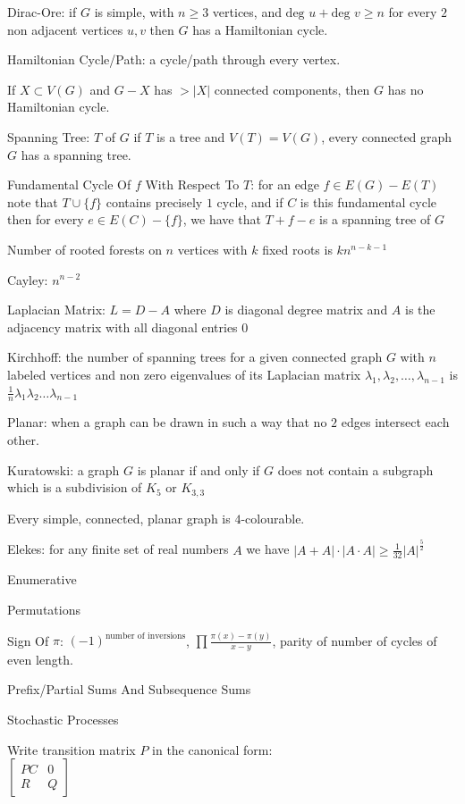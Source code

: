 Dirac-Ore: if $G$ is simple, with $n \ge 3$ vertices, and $\text{deg }u+\text{deg }v \ge n$ for every $2$ non adjacent vertices $u,v$ then $G$ has a Hamiltonian cycle.

Hamiltonian Cycle/Path: a cycle/path through every vertex.

If $X \subset V(G)$ and $G-X$ has $> |X|$ connected components, then $G$ has no Hamiltonian cycle.

Spanning Tree: $T$ of $G$ if $T$ is a tree and $V(T)=V(G)$, every connected graph $G$ has a spanning tree.

Fundamental Cycle Of $f$ With Respect To $T$: for an edge $f \in E(G)-E(T)$ note that $T \cup \{f \}$ contains precisely $1$ cycle, and if $C$ is this fundamental cycle then for every $e \in E(C) - \{ f \}$, we have that $T+f-e$ is a spanning tree of $G$

Number of rooted forests on $n$ vertices with $k$ fixed roots is $kn^{n-k-1}$

Cayley: $n^{n-2}$

Laplacian Matrix: $L=D-A$ where $D$ is diagonal degree matrix and $A$ is the adjacency matrix with all diagonal entries $0$

Kirchhoff: the number of spanning trees for a given connected graph $G$ with $n$ labeled vertices and non zero eigenvalues of its Laplacian matrix $\lambda_1, \lambda_2, \dots, \lambda_{n-1}$ is $\frac{1}{n} \lambda_1 \lambda_2 \dots \lambda_{n-1}$

Planar: when a graph can be drawn in such a way that no $2$ edges intersect each other.

Kuratowski: a graph $G$ is planar if and only if $G$ does not contain a subgraph which is a subdivision of $K_5$ or $K_{3,3}$

Every simple, connected, planar graph is $4$-colourable.

Elekes: for any finite set of real numbers $A$ we have $|A+A| \cdot |A \cdot A| \ge \frac{1}{32} |A|^{\frac{5}{2}}$

Enumerative

Permutations

Sign Of $\pi$: $(-1)^{\text{number of inversions}}$, $\prod \frac{\pi(x)-\pi(y)}{x-y}$, parity of number of cycles of even length.

Prefix/Partial Sums And Subsequence Sums

Stochastic Processes

Write transition matrix $P$ in the canonical form: \\
$\begin{bmatrix}
PC & 0 \\
R & Q
\end{bmatrix}$

